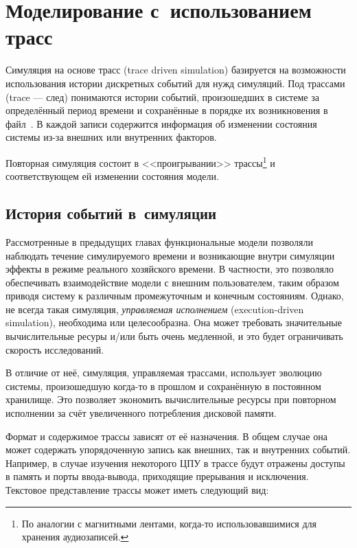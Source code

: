 \chapter{Моделирование с~использованием трасс}\label{chapter05}


Симуляция на основе трасс (\abbr trace driven simulation) базируется на возможности использования истории дискретных событий для нужд симуляций. Под трассами (\abbr trace --- след) понимаются истории событий, произошедших в системе за определённый период времени и сохранённые в порядке их возникновения в файл~\cite{DBLP:conf/ispass/RicoDCERV11}. В каждой записи содержится информация об изменении состояния системы из-за внешних или внутренних факторов. 

Повторная симуляция состоит в <<проигрывании>> трассы\footnote{По аналогии с магнитными лентами, когда-то использовавшимися для хранения аудиозаписей.} и соответствующем ей изменении состояния модели.

\section{История событий в~симуляции}

Рассмотренные в предыдущих главах функциональные модели позволяли наблюдать течение симулируемого времени и возникающие внутри симуляции эффекты в режиме реального хозяйского времени. В частности, это позволяло обеспечивать взаимодействие модели с внешним  пользователем, таким образом приводя систему к различным промежуточным и конечным состояниям. Однако, не всегда такая симуляция, \textit{управляемая исполнением} (\abbr execution-driven simulation), необходима или целесообразна. Она может требовать значительные вычислительные ресуры и/или быть очень медленной, и это будет ограничивать скорость исследований.

В отличие от неё, симуляция, управляемая трассами, использует эволюцию системы, произошедшую когда-то в прошлом и сохранённую в постоянном хранилище. Это позволяет экономить вычислительные ресурсы при повторном исполнении за счёт увеличенного потребления дисковой памяти.

Формат и содержимое трассы зависят от её назначения. В общем случае она может содержать упорядоченную запись как внешних, так и внутренних событий. Например, в случае изучения некоторого ЦПУ в трассе будут отражены доступы в память и порты ввода-вывода, приходящие прерывания и исключения. Текстовое представление трассы может иметь следующий вид:

